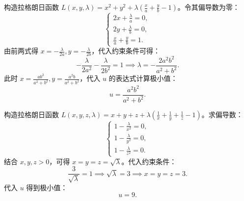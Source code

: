 \begin{solution}

    构造拉格朗日函数 $L(x, y, \lambda) = x^{2} + y^{2} + \lambda \left( \frac{x}{a} + \frac{y}{b} - 1 \right)$。令其偏导数为零：
    \begin{equation}
        \label{eq:p1-lagrange}
        \begin{cases}
            2x + \frac{\lambda}{a} = 0, \\
            2y + \frac{\lambda}{b} = 0, \\
            \frac{x}{a} + \frac{y}{b} = 1.
        \end{cases}
    \end{equation}
    由前两式得 $x = -\frac{\lambda}{2a}, y = -\frac{\lambda}{2b}$，代入约束条件可得：
    \begin{equation}
        -\frac{\lambda}{2 a^{2}} - \frac{\lambda}{2 b^{2}} = 1 \implies \lambda = -\frac{2 a^{2} b^{2}}{a^{2} + b^{2}}.
    \end{equation}
    此时 $x = \frac{a b^{2}}{a^{2} + b^{2}}, y = \frac{a^{2} b}{a^{2} + b^{2}}$，代入 $u$ 的表达式计算极小值：
    \begin{equation}
        \boxed{u = \frac{a^{2} b^{2}}{a^{2} + b^{2}}}.
    \end{equation}


    构造拉格朗日函数 $L(x, y, z, \lambda) = x + y + z + \lambda \left( \frac{1}{x} + \frac{1}{y} + \frac{1}{z} - 1 \right)$。求偏导数：
    \begin{equation}
        \begin{cases}
            1 - \frac{\lambda}{x^{2}} = 0, \\
            1 - \frac{\lambda}{y^{2}} = 0, \\
            1 - \frac{\lambda}{z^{2}} = 0.
        \end{cases}
    \end{equation}
    结合 $x, y, z > 0$，可得 $x = y = z = \sqrt{\lambda}$。代入约束条件：
    \begin{equation}
        \frac{3}{\sqrt{\lambda}} = 1 \implies \sqrt{\lambda} = 3 \implies x = y = z = 3.
    \end{equation}
    代入 $u$ 得到极小值：
    \begin{equation}
        \boxed{u = 9}.
    \end{equation}



\end{solution}
